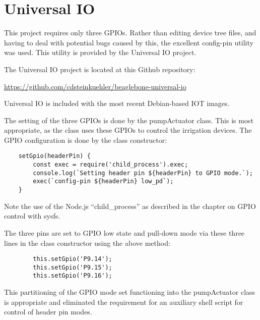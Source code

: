 %
%
%

\chapter{Universal IO}

This project requires only three GPIOs.  Rather than editing device tree files, 
and having to deal with potential bugs caused by this, the excellent config-pin 
utility was used.  This utility is provided by the Universal IO project.

The Universal IO project is located at this Github repository:

\url{https://github.com/cdsteinkuehler/beaglebone-universal-io}

Universal IO is included with the most recent Debian-based IOT images.

The setting of the three GPIOs is done by the pumpActuator class.  This is most 
appropriate, as the class uses these GPIOs to control the irrigation devices.  
The GPIO configuration is done by the class constructor:

\begin{verbatim}
    setGpio(headerPin) {
        const exec = require('child_process').exec;
        console.log(`Setting header pin ${headerPin} to GPIO mode.`);
        exec(`config-pin ${headerPin} low_pd`);
    }
\end{verbatim}

Note the use of the Node.js ``child\_process'' as described in the chapter on 
GPIO control with sysfs.

The three pins are set to GPIO low state and pull-down mode via these three 
lines in the class constructor using the above method:

\begin{verbatim}
        this.setGpio('P9.14');
        this.setGpio('P9.15');
        this.setGpio('P9.16');
\end{verbatim}

This partitioning of the GPIO mode set functioning into the pumpActuator class 
is appropriate and eliminated the requirement for an auxiliary shell script for 
control of header pin modes.




